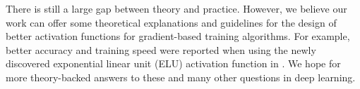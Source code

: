 


%

%
%


There is still a large gap between theory and practice. However, we believe our work can offer some theoretical explanations and guidelines for the design of better activation functions for gradient-based training algorithms. For example, better accuracy and training speed were reported when using the newly discovered exponential linear unit (ELU) activation function in \cite{ClevertUH15, ShahKSS16}. We hope for more theory-backed answers to these and many other questions in deep learning.



